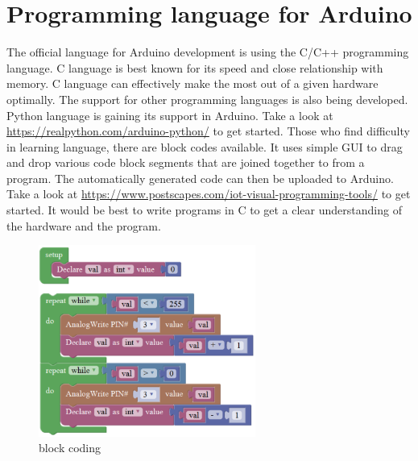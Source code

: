 \section{Programming language for Arduino}
The official language for Arduino development is using the C/C++ programming language. C language is best known for its speed and close relationship with memory. C language can effectively make the most out of a given hardware optimally. The support for other programming languages is also being developed. Python language is gaining its support in Arduino. Take a look at \url{https://realpython.com/arduino-python/} to get started. Those who find difficulty in learning language, there are block codes available. It uses simple GUI to drag and drop various code block segments that are joined together to from a program. The automatically generated code can then be uploaded to Arduino. Take a look at \url{https://www.postscapes.com/iot-visual-programming-tools/} to get started. It would be best to write programs in C to get a clear understanding of the hardware and the program.

\begin{figure}
    \centering
    \includegraphics[width=2.8in]{Images/Programing_Arduino/block_code.png}
    \caption{block coding}
\end{figure}

\pagebreak
